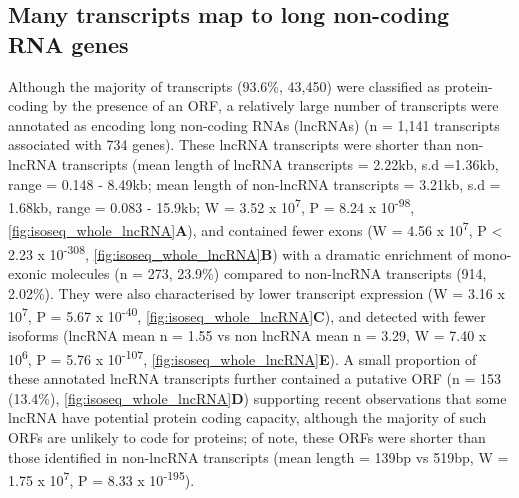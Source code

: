 \subsection{Many transcripts map to long non-coding RNA genes}
Although the majority of transcripts (93.6\%, 43,450) were classified as protein-coding by the presence of an ORF, a relatively large number of transcripts were annotated as encoding long non-coding RNAs (lncRNAs) (n = 1,141 transcripts associated with 734 genes). These lncRNA transcripts were shorter than non-lncRNA transcripts (mean length of lncRNA transcripts = 2.22kb, s.d =1.36kb, range = 0.148 - 8.49kb; mean length of non-lncRNA transcripts = 3.21kb, s.d = 1.68kb, range = 0.083 - 15.9kb; W = 3.52 x 10\textsuperscript{7}, P = 8.24 x 10\textsuperscript{-98}, \cref{fig:isoseq_whole_lncRNA}\textbf{A}), and contained fewer exons\cite{Statello2020} (W = 4.56 x 10\textsuperscript{7}, P < 2.23 x 10\textsuperscript{-308}, \cref{fig:isoseq_whole_lncRNA}\textbf{B}) with a dramatic enrichment of mono-exonic molecules\cite{Kuo2017} (n = 273, 23.9\%) compared to non-lncRNA transcripts (914, 2.02\%). They were also characterised by lower transcript expression\cite{Statello2020, Liu2016a} (W = 3.16 x 10\textsuperscript{7}, P = 5.67 x 10\textsuperscript{-40}, \cref{fig:isoseq_whole_lncRNA}\textbf{C}), and detected with fewer isoforms (lncRNA mean n = 1.55 vs non lncRNA mean n = 3.29, W = 7.40 x 10\textsuperscript{6}, P = 5.76 x 10\textsuperscript{-107}, \cref{fig:isoseq_whole_lncRNA}\textbf{E}). A small proportion of these annotated lncRNA transcripts further contained a putative ORF (n = 153 (13.4\%), \cref{fig:isoseq_whole_lncRNA}\textbf{D}) supporting recent observations that some lncRNA have potential protein coding capacity\cite{Kageyama2011}, although the majority of such ORFs are unlikely to code for proteins\cite{Guttman2013}; of note, these ORFs were shorter than those identified in non-lncRNA transcripts (mean length = 139bp vs 519bp, W = 1.75 x 10\textsuperscript{7}, P = 8.33 x 10\textsuperscript{-195}). 

